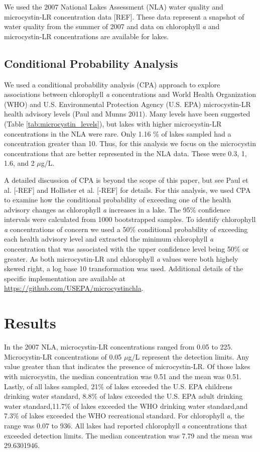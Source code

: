 \documentclass[11pt,]{article}
\begin{document}
We used the 2007 National Lakes Assessment (NLA) water quality and
microcystin-LR concentration data {[}REF{]}. These data represent a
snapshot of water quality from the summer of 2007 and data on
chlorophyll \emph{a} and microcystin-LR concentrations are available for
lakes.

\subsection{Conditional Probability
Analysis}\label{conditional-probability-analysis}

We used a conditional probability analysis (CPA) approach to explore
associations between chlorophyll \emph{a} concentrations and World
Health Organization (WHO) and U.S. Environmental Protection Agency (U.S.
EPA) microcystin-LR health advisory levels (Paul and Munns 2011). Many
levels have been suggested (Table \ref{tab:microcystin_levels}), but
lakes with higher microcystin-LR concentrations in the NLA were rare.
Only 1.16 \% of lakes sampled had a concentration greater than 10. Thus,
for this analysis we focus on the microcystin concentrations that are
better represented in the NLA data. These were 0.3, 1, 1.6, and 2
\(\mu\)g/L.

A detailed discussion of CPA is beyond the scope of this paper, but see
Paul et al. {[}-REF{]} and Hollister et al. {[}-REF{]} for details. For
this analysis, we used CPA to examine how the conditional probability of
exceeding one of the health advisory changes as chlorophyll \emph{a}
increases in a lake. The 95\% confidence intervals were calculated from
1000 bootstrapped samples. To identify chlorophyll \emph{a}
concentrations of concern we used a 50\% conditional probability of
exceeding each health advisory level and extracted the minimum
chlorophyll \emph{a} concentration that was associated with the upper
confidence level being 50\% or greater. As both microcystin-LR and
chlorophyll \emph{a} values were both highely skewed right, a log base
10 transformation was used. Additional details of the specific
implementation are available at
\url{https://github.com/USEPA/microcystinchla}.

\section{Results}\label{results}

In the 2007 NLA, microcystin-LR concentrations ranged from 0.05 to 225.
Microcystin-LR concentrations of 0.05 \(\mu\)g/L represent the detection
limits. Any value greater than that indicates the presence of
microcystin-LR. Of those lakes with microcystin, the median
concentration was 0.51 and the mean was 0.51. Lastly, of all lakes
sampled, 21\% of lakes exceeded the U.S. EPA childrens drinking water
standard, 8.8\% of lakes exceeded the U.S. EPA adult drinking water
standard,11.7\% of lakes exceeded the WHO drinking water standard,and
7.3\% of lakes exceeded the WHO recreational standard. For chlorophyll
\emph{a}, the range was 0.07 to 936. All lakes had reported chlorophyll
\emph{a} concentrations that exceeded detection limits. The median
concentration was 7.79 and the mean was 29.6301946.
\end{document}
